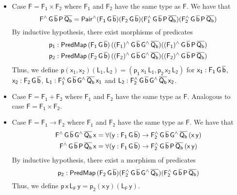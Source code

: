 \documentclass[acmsmall,screen,review,anonymous]{acmart}
\theoremstyle{definition}
\begin{document}
\begin{itemize}
\item Case $\mathsf{F = F_1 \times F_2}$ where $\mathsf{F_1}$ and $\mathsf{F_2}$ have the same type as $\mathsf{F}$.
We have that
\[
\mathsf{F^{\wedge}\,G\,\overline{b}\,P\,\overline{Q_b}
= Pair^{\wedge}(F_1\,G\,\overline{b})(F_2\,G\,\overline{b})(F_1^{\wedge}\,G\,\overline{b}\,P\,\overline{Q_b}) (F_2^{\wedge}\,G\,\overline{b}\,P\,\overline{Q_b})}
\]
By inductive hypothesis, there exist morphisms of predicates
\begin{gather*}
\mathsf{p_1 : PredMap\,(F_1\,G\,\overline{b})\,((F_1)^{\wedge}\,G\,\overline{b}\,G^{\wedge}\,\overline{Q_b}) ((F_1)^{\wedge}\,G\,\overline{b}\,P\,\overline{Q_b})} \\
\mathsf{p_2 : PredMap\,(F_2\,G\,\overline{b})\,((F_2)^{\wedge}\,G\,\overline{b}\,G^{\wedge}\,\overline{Q_b}) ((F_2)^{\wedge}\,G\,\overline{b}\,P\,\overline{Q_b})}
\end{gather*}
Thus, we define $\mathsf{p (x_1, x_2) (L_1, L_2) = (p_1\,x_1\,L_1, p_2\,x_2\,L_2)}$ 
for 
$\mathsf{x_1 : F_1\,G\,\overline{b}}$,
$\mathsf{x_2 : F_2\,G\,\overline{b}}$,
$\mathsf{L_1 : F_1^{\wedge}\,G\,\overline{b}\,G^{\wedge}\,\overline{Q_b}\,x_1}$
and $\mathsf{L_2 : F_2^{\wedge}\,G\,\overline{b}\,G^{\wedge}\,\overline{Q_b}\,x_2}$.
\item Case $\mathsf{F = F_1 + F_2}$ where $\mathsf{F_1}$ and $\mathsf{F_2}$ have the same type as $\mathsf{F}$.
Analogous to case $\mathsf{F = F_1 \times F_2}$.
\item Case $\mathsf{F = F_1 \to F_2}$
where $\mathsf{F_1}$ and $\mathsf{F_2}$ have the same type as $\mathsf{F}$.
We have that
\begin{gather*}
\mathsf{F^{\wedge}\,G\,\overline{b}\,G^{\wedge}\,\overline{Q_b}\,x = \forall (y : F_1\,G\,\overline{b}) \to F_2^{\wedge}\,G\,\overline{b}\,G^{\wedge}\,\overline{Q_b}\,(x\,y)} \\
\mathsf{F^{\wedge}\,G\,\overline{b}\,P\,\overline{Q_b}\,x = \forall (y : F_1\,G\,\overline{b}) \to F_2^{\wedge}\,G\,\overline{b}\,P\,\overline{Q_b}\,(x\,y)}
\end{gather*}
By inductive hypothesis, there exist a morphism of predicates
\[
\mathsf{p_2 : PredMap\,(F_2\,G\,\overline{b}) (F_2^{\wedge}\,G\,\overline{b}\,G^{\wedge}\,\overline{Q_b}) (F_2^{\wedge}\,G\,\overline{b}\,P\,\overline{Q_b})}
\]
Thus, we define $\mathsf{p\,x\,L_F\,y = p_2 (x\,y) (L_F\,y)}$.

\end{itemize}
\end{document}
